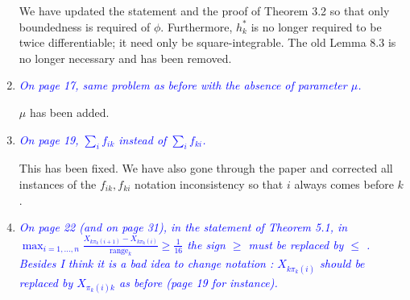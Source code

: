 \documentclass[pdftex,12pt]{article}
\let\hat\widehat
\def\rc#1{{\it\textcolor{blue}{#1}}\smallskip}
\begin{document}
\begin{enumerate}
We have updated the statement and the proof of Theorem 3.2 so that only boundedness is required of $\phi$. Furthermore, $h^*_k$ is no longer required to be twice differentiable; it need only be square-integrable. The old Lemma 8.3 is no longer necessary and has been removed. 

\item \rc{On page 17, same problem as before with the absence of parameter $\mu$.}

$\mu$ has been added.



\item \rc{On page 19, $\sum_{i} f_{ik}$ instead of $\sum_i
  f_{ki}$.}

This has been fixed. We have also gone through the paper and corrected
all instances of the $f_{ik}, f_{ki}$ notation inconsistency so that
$i$ always comes before $k$.





\item \rc{On page 22 (and on page 31), in the statement of Theorem
  5.1, in\\ $\max_{i=1,\ldots, n} \frac{X_{k\pi_k(i+1)}-
    X_{k\pi_k(i)}}{\text{range}_k} \geq \frac{1}{16}$ the
sign $\geq$ must be replaced by $\leq$ . Besides I think it
is a bad idea to change notation : $X_{k\pi_k(i)}$ should
be replaced by $X_{\pi_k(i)k}$ as before (page 19 for instance).}


\end{enumerate}
\end{document}
